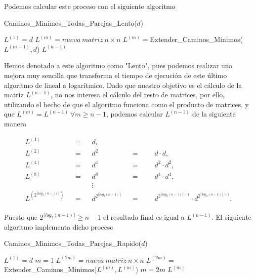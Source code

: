 Podemos calcular este proceso con el siguiente algoritmo

\begin{breakablealgorithm}
	\caption{Caminos\_Minimos\_Todas\_Parejas\_Lento($d$)}
	\begin{algorithmic}[1]
		\State $L^{(1)}=d$
			\State $L^{(m)}=nueva\ matriz\ n\times n$
			\State $L^{(m)}=$Extender\_Caminos\_Minimos($L^{(m-1)},d$)
		\EndFor
		\Return $L^{(n-1)}$
	\end{algorithmic}
\end{breakablealgorithm}

Hemos denotado a este algoritmo como "Lento", pues podemos realizar una mejora muy sencilla que transforma el tiempo de ejecución de este último algoritmo de lineal a logarítmico. Dado que nuestro objetivo es el cálculo de la matriz $L^{(n-1)}$, no nos interesa el cálculo del resto de matrices, por ello, utilizando el hecho de que el algoritmo funciona como el producto de matrices, y que $L^{(m)}=L^{(n-1)}\ \forall m\geq n-1$, podemos calcular $L^{(n-1)}$ de la siguiente manera

\begin{adjustwidth}{3.5cm}{10cm}
	\begin{align*}
		L^{(1)} &&=&&  d, \\
		L^{(2)} &&=&&   d^2 &&=&& & d\cdot d,\\
		L^{(4)} &&=&&   d^4 &&=&&  &d^2\cdot d^2,\\
		L^{(8)} &&=&&   d^8 &&=&&  &d^4\cdot d^4,\\
		&&&& \vdots \\
		L^{(2^{\lceil log_2(n-1)\rceil })} &&=&& d^{2^{\lceil log_2(n-1)\rceil }} &&=&&  &d^{2^{\lceil log_2(n-1)\rceil -1}}\cdot d^{2^{\lceil log_2(n-1)\rceil -1}}.\\
	\end{align*}
\end{adjustwidth}

Puesto que $2^{\lceil log_2(n-1)\rceil}\geq n-1$ el resultado final es igual a $L^{(n-1)}$. El siguiente algoritmo implementa dicho proceso

\begin{breakablealgorithm}
	\caption{Caminos\_Minimos\_Todas\_Parejas\_Rapido($d$)}
	\begin{algorithmic}[1]
		\State $L^{(1)}=d$
		\State $m=1$
			\State $L^{(2m)}=nueva\ matriz\ n\times n$
			\State $L^{(2m)}=$Extender\_Caminos\_Minimos($L^{(m)},L^{(m)}$)
			\State $m=2m$
		\EndWhile
		\Return $L^{(m)}$
	\end{algorithmic}
\end{breakablealgorithm}

